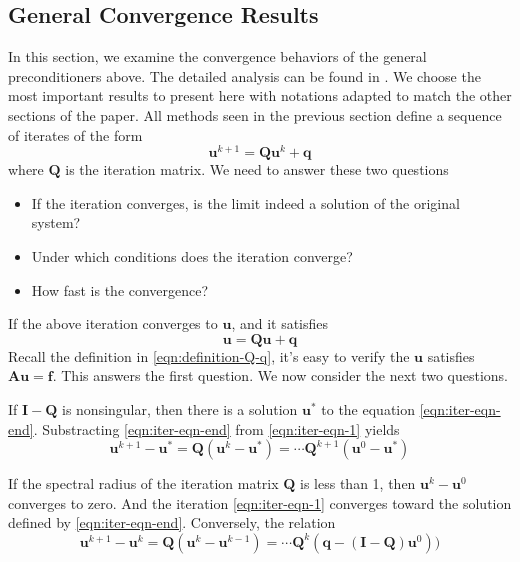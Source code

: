 \subsection{General Convergence Results}
\label{section:convergence-analysis}
In this section, we examine the convergence behaviors of the general preconditioners above. The detailed analysis can be found in \cite{saad2003iterative}. We choose the most important results to present here with notations adapted to match the other sections of the paper.
All methods seen in the previous section define a sequence of iterates of the form
\begin{equation}
    \boldsymbol{u}^{k+1} = \boldsymbol{Q}\boldsymbol{u}^k + \boldsymbol{q}
    \label{eqn:iter-eqn-1}
\end{equation}
where $\boldsymbol{Q}$ is the iteration matrix. We need to answer these two questions
\begin{itemize}
    \item If the iteration converges, is the limit indeed a solution of the original system?
    \item Under which conditions does the iteration converge?
    \item How fast is the convergence?
\end{itemize}
If the above iteration converges to $\boldsymbol{u}$, and it satisfies
\begin{equation}
    \boldsymbol{u} = \boldsymbol{Q}\boldsymbol{u} + \boldsymbol{q}
    \label{eqn:iter-eqn-end}
\end{equation}
Recall the definition in \autoref{eqn:definition-Q-q}, it's easy to verify the $\boldsymbol{u}$ satisfies $\boldsymbol{A}\boldsymbol{u}= \boldsymbol{f}$. This answers the first question. We now consider the next two questions.

If $\boldsymbol{I} - \boldsymbol{Q}$ is nonsingular, then there is a solution $\boldsymbol{u}^*$ to the equation \autoref{eqn:iter-eqn-end}. Substracting \autoref{eqn:iter-eqn-end} from \autoref{eqn:iter-eqn-1} yields
\begin{equation}
    \boldsymbol{u}^{k+1} - \boldsymbol{u}^* = \boldsymbol{Q}(\boldsymbol{u}^k - \boldsymbol{u}^*) = \cdots \boldsymbol{Q}^{k+1}(\boldsymbol{u}^0 - \boldsymbol{u}^*)
\end{equation}



If the spectral radius of the iteration matrix $\boldsymbol{Q}$ is less than 1, then $\boldsymbol{u}^k - \boldsymbol{u}^0$ converges to zero. And the iteration \autoref{eqn:iter-eqn-1} converges toward the solution defined by \autoref{eqn:iter-eqn-end}. Conversely, the relation
\begin{equation}
    \boldsymbol{u}^{k+1} - \boldsymbol{u}^k = \boldsymbol{Q}(\boldsymbol{u}^{k} - \boldsymbol{u}^{k-1}) = \cdots \boldsymbol{Q}^{k} (\boldsymbol{q} - (\boldsymbol{I} - \boldsymbol{Q})\boldsymbol{u}^0))
\end{equation}

